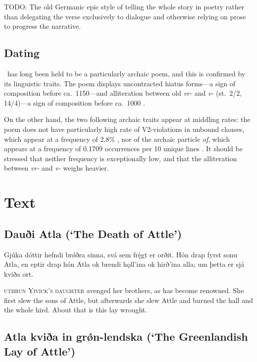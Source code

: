 TODO: The old Germanic epic style of telling the whole story in poetry rather than delegating the verse exclusively to dialogue and otherwise relying on prose to progress the narrative.

\subsection{Dating}

\Atlakvida\ has long been held to be a particularly archaic poem, and this is confirmed by its linguistic traits.  The poem displays uncontracted hiatus forms---a sign of composition before ca.~1150---and alliteration between old \emph{vr-} and \emph{v-} (st.~2/2, 14/4)---a sign of composition before ca.~1000 \parencite[36--38]{Haukur2023}.

On the other hand, the two following archaic traits appear at middling rates: the poem does not have particularly high rate of V2-violations in unbound clauses, which appear at a frequency of 2.8\% \parencite[243, 255]{Haukur2012}, nor of the archaic particle \emph{of}, which appears at a frequency of 0.1709 occurrences per 10 unique lines \parencite[70]{Sapp2022}.  It should be stressed that neither frequency is exceptionally low, and that the alliteration between \emph{vr-} and \emph{v-} weighs heavier.

\newpage

\section{Text}

\subsection{Dauði Atla (‘The Death of Attle’)}

\bpg\bpa{}%
 Gjúka dóttir hefndi brǿðra sinna, svá sem frę́gt er orðit.  Hón drap fyrst sonu Atla, en eptir drap hón Atla ok brendi hǫll’ina ok hirð’ina alla; um þetta er sjá kviða ort.\epa

\textsc{uthrun Yivick’s daughter} avenged her brothers, as has become renowned.  She first slew the sons of Attle, but afterwards she slew Attle and burned the hall and the whole hird.  About that is this lay wrought.\epb\epg

\subsection{Atla kviða in grǿn-lendska (‘The Greenlandish Lay of Attle’)}


